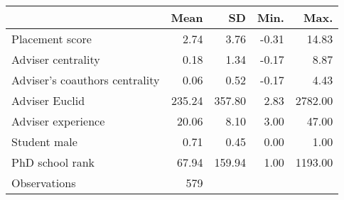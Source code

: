 {
\def\sym#1{\ifmmode^{#1}\else\(^{#1}\)\fi}
\begin{tabular}{l*{1}{rrrr}}
\toprule
                    &        Mean&          SD&        Min.&        Max.\\
\midrule
Placement score     &        2.74&        3.76&       -0.31&       14.83\\
Adviser centrality  &        0.18&        1.34&       -0.17&        8.87\\
Adviser's coauthors centrality&        0.06&        0.52&       -0.17&        4.43\\
Adviser Euclid      &      235.24&      357.80&        2.83&     2782.00\\
Adviser experience  &       20.06&        8.10&        3.00&       47.00\\
Student male        &        0.71&        0.45&        0.00&        1.00\\
PhD school rank     &       67.94&      159.94&        1.00&     1193.00\\
\midrule
Observations        &         579&            &            &            \\
\bottomrule
\end{tabular}
}
